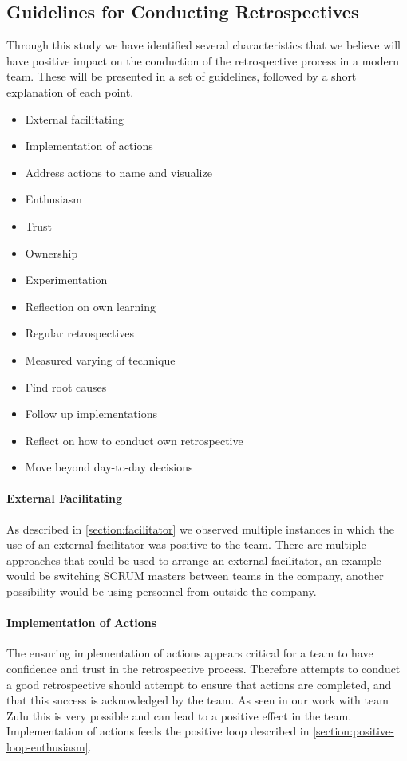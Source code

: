 \subsection{Guidelines for Conducting Retrospectives}

Through this study we have identified several characteristics that we believe will have positive impact on the conduction of the retrospective process in a modern team. These will be presented in a set of guidelines, followed by a short explanation of each point.

\begin{itemize}
	\setlength\itemsep{1pt}
	\item External facilitating
	\item Implementation of actions 
	\item Address actions to name and visualize
	\item Enthusiasm
	\item Trust
	\item Ownership
	\item Experimentation
	\item Reflection on own learning
	\item Regular retrospectives
	\item Measured varying of technique
	\item Find root causes
	\item Follow up implementations
	\item Reflect on how to conduct own retrospective
	\item Move beyond day-to-day decisions
\end{itemize}

\paragraph{External Facilitating}
As described in \autoref{section:facilitator} we observed multiple instances in which the use of an external facilitator was positive to the team. There are multiple approaches that could be used to arrange an external facilitator, an example would be switching SCRUM masters between teams in the company, another possibility would be using personnel from outside the company.

\paragraph{Implementation of Actions}
The ensuring implementation of actions appears critical for a team to have confidence and trust in the retrospective process. Therefore attempts to conduct a good retrospective should attempt to ensure that actions are completed, and that this success is acknowledged by the team. As seen in our work with team Zulu this is very possible and can lead to a positive effect in the team. Implementation of actions feeds the positive loop described in \autoref{section:positive-loop-enthusiasm}.

